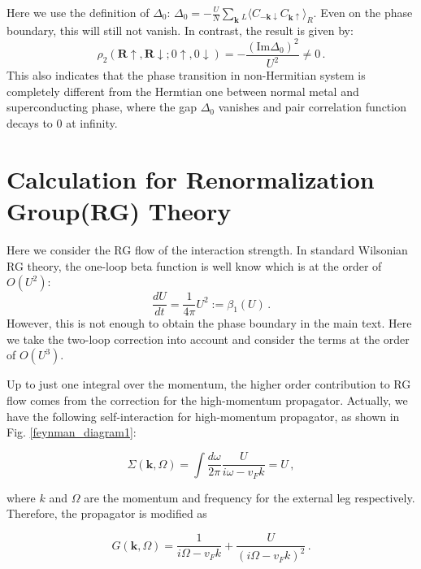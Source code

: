 \documentclass[aps,onecolumn,nofootinbib,superscriptaddress,notitlepage,longbibliography]{revtex4-1}
\begin{document}
Here we use the definition of $\Delta_{0}$: $\Delta_{0}=-\frac{U}{N}\sum_{\boldsymbol{k}}{}_{L}\langle C_{-\boldsymbol{k}\downarrow}C_{\boldsymbol{k}\uparrow}\rangle_{R}$.
Even on the phase boundary, this will still not vanish. In contrast,
the result is given by: 
\begin{equation}
\rho_{2}(\boldsymbol{R}\uparrow,\boldsymbol{R}\downarrow;0\uparrow,0\downarrow)=-\frac{(\text{Im}\Delta_{0})^{2}}{U^{2}}\neq0\,.
\end{equation}
This also indicates that the phase transition in non-Hermitian system
is completely different from the Hermtian one between normal metal
and superconducting phase, where the gap $\Delta_{0}$ vanishes and
pair correlation function decays to 0 at infinity.

\section{Calculation for Renormalization Group(RG) Theory}

Here we consider the RG flow of the interaction strength. In standard
Wilsonian RG theory, the one-loop beta function is well know which
is at the order of $O(U^{2})$: 
\begin{equation}
\frac{dU}{dt}=\frac{1}{4\pi}U^{2}:=\beta_{1}(U)\,.
\end{equation}
However, this is not enough to obtain the phase boundary in the main
text. Here we take the two-loop correction into account and consider
the terms at the order of $O(U^{3})$.

Up to just one integral over the momentum, the higher order contribution
to RG flow comes from the correction for the high-momentum propagator.
Actually, we have the following self-interaction for high-momentum
propagator, as shown in Fig. \ref{feynman_diagram1}:

\begin{equation}
\Sigma(\bm{k},\Omega)=\int\frac{d\omega}{2\pi}\frac{U}{i\omega-v_{F}k}=U\,,
\end{equation}

where $k$ and $\Omega$ are the momentum and frequency for the external
leg respectively. Therefore, the propagator is modified as

\begin{equation}
G(\bm{k},\Omega)=\frac{1}{i\Omega-v_{F}k}+\frac{U}{(i\Omega-v_{F}k)^{2}}\,.
\end{equation}
\end{document}
